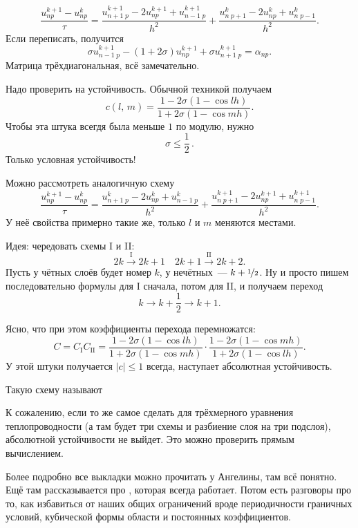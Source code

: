 \documentclass{trlnotes}
\begin{document}
    \[
        \dfrac{u^{k+1}_{np} - u^{k}_{np}}{\tau} = \dfrac{u^{k+1}_{n+1 \; p} - 2u^{k+1}_{np} + u^{k+1}_{n-1 \; p}}{h^2} + \dfrac{u^k_{n \; p+1} - 2u^k_{np} + u^k_{n \; p - 1}}{h^2}.
    \]
    Если переписать, получится
    \[
        \sigma u^{k+1}_{n-1 \; p} - (1 + 2\sigma) u_{np}^{k+1} + \sigma u^{k+1}_{n+1 \; p} = \alpha_{np}.
    \]
    Матрица трёхдиагональная, всё замечательно.

    Надо проверить на устойчивость. Обычной техникой получаем
    \[
        c(l, \, m) = \dfrac{1 - 2\sigma(1 - \cos lh)}{1 + 2\sigma(1 - \cos mh)}.
    \]
    Чтобы эта штука всегдя была меньше $1$ по модулю, нужно
    \[
        \boxed{\sigma \leqslant \dfrac{1}{2}}\,.
    \]
    Только условная устойчивость!

    Можно рассмотреть аналогичную схему
    \[
        \dfrac{u^{k+1}_{np} - u^{k}_{np}}{\tau} = \dfrac{u^{k}_{n+1 \; p} - 2u^{k}_{np} + u^{k}_{n-1 \; p}}{h^2} + \dfrac{u^{k+1}_{n \; p+1} - 2u^{k+1}_{np} + u^{k+1}_{n \; p - 1}}{h^2}.
    \]
    У неё свойства примерно такие же, только $l$ и $m$ меняются местами.

    Идея: чередовать схемы I и II:
    \[
        2k \xrightarrow{\text{I}} 2k+1 \quad 2k+1 \xrightarrow{\text{II}} 2k+2.
    \]
    Пусть у чётных слоёв будет номер $k$, у нечётных~--- $k + \nicefrac{1}{2}$. Ну и просто пишем последовательно формулы для I сначала, потом для II, и получаем переход
    \[
        k \to k+ \frac{1}{2} \to k+1.
    \]

    Ясно, что при этом коэффициенты перехода перемножатся:
    \[
        C = C_{\text{I}} C_{\text{II}} = \dfrac{1 - 2\sigma(1 - \cos lh)}{1 + 2\sigma(1 - \cos mh)} \cdot \dfrac{1 - 2\sigma(1 - \cos mh)}{1 + 2\sigma(1 - \cos lh)}.
    \]
    У этой штуки получается $|c| \leqslant 1$ всегда, наступает абсолютная устойчивость.

    Такую схему называют 

    \begin{rem}
        К сожалению, если то же самое сделать для трёхмерного уравнения теплопроводности (а там будет три схемы и разбиение слоя на три подслоя), абсолютной устойчивости не выйдет. Это можно проверить прямым вычислением.
    \end{rem}

    \begin{rem}
        Более подробно все выкладки можно прочитать у Ангелины, там всё понятно. Ещё там рассказывается про , которая всегда работает. Потом есть разговоры про то, как избавиться от наших общих ограничений вроде периодичности граничных условий, кубической формы области и постоянных коэффициентов.
    \end{rem}
\end{document}
